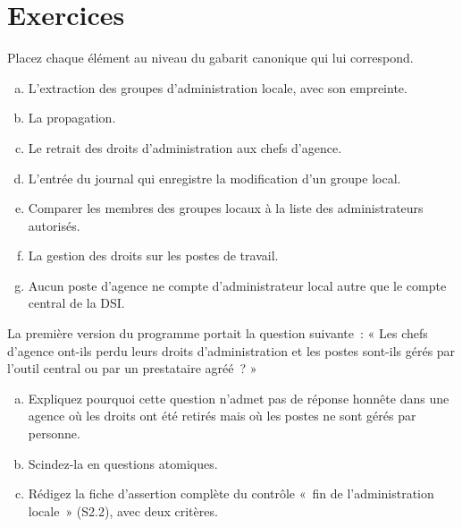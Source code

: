 \section*{Exercices}

\begin{boxexo}[title={\ding{45}\quad Exercice~7.1. À quel niveau~? \niveaubase}]
Placez chaque élément au niveau du gabarit canonique qui lui correspond.
\begin{enumerate}[(a)]
    \item L'extraction des groupes d'administration locale, avec son
          empreinte.
    \item La propagation.
    \item Le retrait des droits d'administration aux chefs d'agence.
    \item L'entrée du journal qui enregistre la modification d'un groupe
          local.
    \item Comparer les membres des groupes locaux à la liste des
          administrateurs autorisés.
    \item La gestion des droits sur les postes de travail.
    \item Aucun poste d'agence ne compte d'administrateur local autre que
          le compte central de la DSI.
\end{enumerate}
\end{boxexo}

\begin{boxexo}[title={\ding{45}\quad Exercice~7.2. Rendre atomique \niveaumoyen}]
La première version du programme portait la question suivante~: « Les
chefs d'agence ont-ils perdu leurs droits d'administration et les postes
sont-ils gérés par l'outil central ou par un prestataire agréé~? »
\begin{enumerate}[(a)]
    \item Expliquez pourquoi cette question n'admet pas de réponse honnête
          dans une agence où les droits ont été retirés mais où les postes
          ne sont gérés par personne.
    \item Scindez-la en questions atomiques.
    \item Rédigez la fiche d'assertion complète du contrôle «~fin de
          l'administration locale~» (S2.2), avec deux critères.
\end{enumerate}
\end{boxexo}

